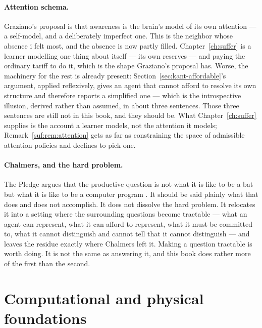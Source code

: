 \paragraph{Attention schema.}
Graziano's proposal \cite{graziano2013} is that awareness is the
brain's model of its own attention --- a self-model, and a
deliberately imperfect one.
This is the neighbor whose absence i felt most, and the absence is now
partly filled.
Chapter~\ref{ch:suffer} is a learner modelling one thing about itself
--- its own reserves --- and paying the ordinary tariff to do it, which
is the shape Graziano's proposal has.
Worse, the machinery for the rest is already present:
Section~\ref{sec:kant-affordable}'s argument, applied reflexively,
gives an agent that cannot afford to resolve its own structure and
therefore reports a simplified one --- which is the introspective
illusion, derived rather than assumed, in about three sentences.
Those three sentences are still not in this book, and they should be.
What Chapter~\ref{ch:suffer} supplies is the account a learner models,
not the attention it models; Remark~\ref{suf:rem:attention} gets as far
as constraining the space of admissible attention policies and declines
to pick one.

\paragraph{Chalmers, and the hard problem.}
The Pledge argues that the productive question is not what it is
like to be a bat but what it is like to be a computer program
\cite{nagel1974,chalmers1996}.
It should be said plainly what that does and does not accomplish.
It does not dissolve the hard problem.
It relocates it into a setting where the surrounding questions
become tractable --- what an agent can represent, what it can
afford to represent, what it must be committed to, what it cannot
distinguish and cannot tell that it cannot distinguish --- and
leaves the residue exactly where Chalmers left it.
Making a question tractable is worth doing.
It is not the same as answering it, and this book does rather more
of the first than the second.

\section*{Computational and physical foundations}

